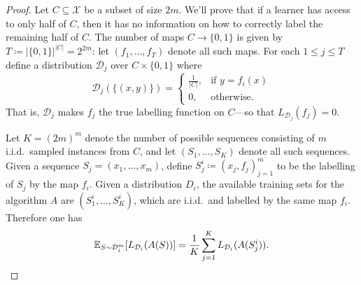 \begin{proof}
Let \(C \subseteq \mathcal{X}\) be a subset of size \(2 m\). We'll prove that if
a learner has access to only half of \(C\), then it has no information on how to
correctly label the remaining half of \(C\). The number of maps
\(C \to \{0, 1\}\) is given by \(T \coloneq |\{0, 1\}|^{|C|} = 2^{2m}\): let
\((f_1, \dots, f_T)\) denote all such maps. For each \(1 \leq j \leq T\) define
a distribution \(\mathcal{D}_j\) over \(C \times \{0, 1\}\) where
\[
\mathcal{D}_j(\{(x, y)\}) =
\begin{cases}
  \frac{1}{|C|}, &\text{if } y = f_i(x) \\
  0, &\text{otherwise.}
\end{cases}
\]
That is, \(\mathcal{D}_j\) makes \(f_j\) the true labelling function on
\(C\)---so that \(L_{\mathcal{D}_j}(f_j) = 0\).

Let \(K = (2 m)^m\) denote the number of possible sequences consisting of \(m\)
i.i.d.~sampled instances from \(C\), and let \((S_1, \dots, S_K)\) denote all
such sequences. Given a sequence \(S_j = (x_1, \dots, x_m)\), define
\(S_j^i \coloneq (x_j, f_j)_{j=1}^m\) to be the labelling of \(S_j\) by the map
\(f_i\). Given a distribution \(D_i\), the available training sets for the
algorithm \(A\) are \((S_1^i, \dots, S_K^i)\), which are i.i.d.~and labelled by
the same map \(f_i\). Therefore one has
\begin{equation}\label{eq:nfl-expect-AS}
\operatorname{\mathbb{E}}_{S \sim \mathcal{D}_i^m}[L_{\mathcal{D}_i}(A(S))]
= \frac{1}{K} \sum_{j=1}^K L_{\mathcal{D}_i}(A(S_{j}^i)).
\end{equation}


\end{proof}
